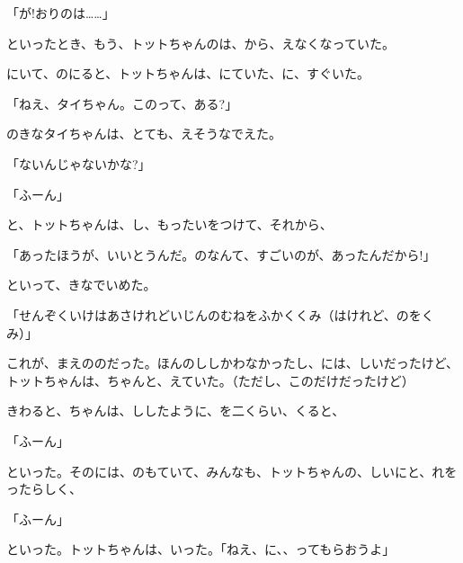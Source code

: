 「が!おりのは……」

といったとき、もう、トットちゃんのは、から、えなくなっていた。

にいて、のにると、トットちゃんは、にていた、に、すぐいた。

「ねえ、タイちゃん。このって、ある?」

のきなタイちゃんは、とても、えそうなでえた。

「ないんじゃないかな?」

「ふーん」

と、トットちゃんは、し、もったいをつけて、それから、

「あったほうが、いいとうんだ。のなんて、すごいのが、あったんだから!」

といって、きなでいめた。

「せんぞくいけはあさけれどいじんのむねをふかくくみ（はけれど、のをくみ）」

これが、まえののだった。ほんのししかわなかったし、には、しいだったけど、トットちゃんは、ちゃんと、えていた。（ただし、このだけだったけど）

きわると、ちゃんは、ししたように、を二くらい、くると、

「ふーん」

といった。そのには、のもていて、みんなも、トットちゃんの、しいにと、れをったらしく、

「ふーん」

といった。トットちゃんは、いった。「ねえ、に、、ってもらおうよ」

